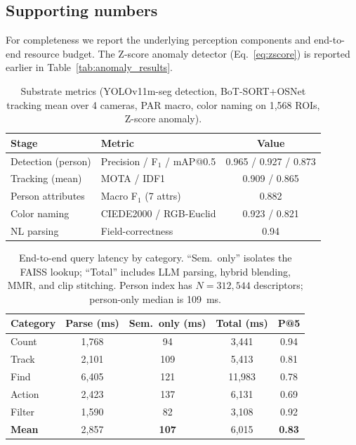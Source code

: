 ﻿\documentclass[conference]{IEEEtran}
\theoremstyle{definition}
\begin{document}
\subsection{Supporting numbers}
For completeness we report the underlying perception components and end-to-end resource budget. The Z-score anomaly detector (Eq.~\eqref{eq:zscore}) is reported earlier in Table~\ref{tab:anomaly_results}.
\begin{table}[!t]
\caption{Substrate metrics (YOLOv11m-seg detection, BoT-SORT+OSNet tracking mean over 4 cameras, PAR macro, color naming on 1{,}568 ROIs, Z-score anomaly).}
\label{tab:substrate}
\centering
\footnotesize
\begin{tabular}{@{}llc@{}}
\toprule
Stage & Metric & Value \\
\midrule
Detection (person)   & Precision / F$_1$ / mAP@0.5 & 0.965 / 0.927 / 0.873 \\
Tracking (mean)      & MOTA / IDF1                  & 0.909 / 0.865 \\
Person attributes    & Macro F$_1$ (7 attrs)        & 0.882 \\
Color naming         & CIEDE2000 / RGB-Euclid       & 0.923 / 0.821 \\
NL parsing           & Field-correctness            & 0.94 \\
\bottomrule
\end{tabular}
\end{table}

\begin{table}[!t]
\caption{End-to-end query latency by category. ``Sem.\ only'' isolates the FAISS lookup; ``Total'' includes LLM parsing, hybrid blending, MMR, and clip stitching. Person index has $N{=}312{,}544$ descriptors; person-only median is 109~ms.}
\label{tab:query_performance}
\centering
\scriptsize
\setlength{\tabcolsep}{3pt}
\begin{tabular*}{\columnwidth}{@{\extracolsep{\fill}}lcccc@{}}
\toprule
Category & Parse (ms) & Sem.\ only (ms) & Total (ms) & P@5 \\
\midrule
Count   & 1{,}768 & \phantom{0}94 & 3{,}441 & 0.94 \\
Track   & 2{,}101 & 109           & 5{,}413 & 0.81 \\
Find    & 6{,}405 & 121           & 11{,}983 & 0.78 \\
Action  & 2{,}423 & 137           & 6{,}131 & 0.69 \\
Filter  & 1{,}590 & \phantom{0}82 & 3{,}108 & 0.92 \\
\midrule
\textbf{Mean} & 2{,}857 & \textbf{107} & 6{,}015 & \textbf{0.83} \\
\bottomrule
\end{tabular*}
\end{table}
\end{document}

